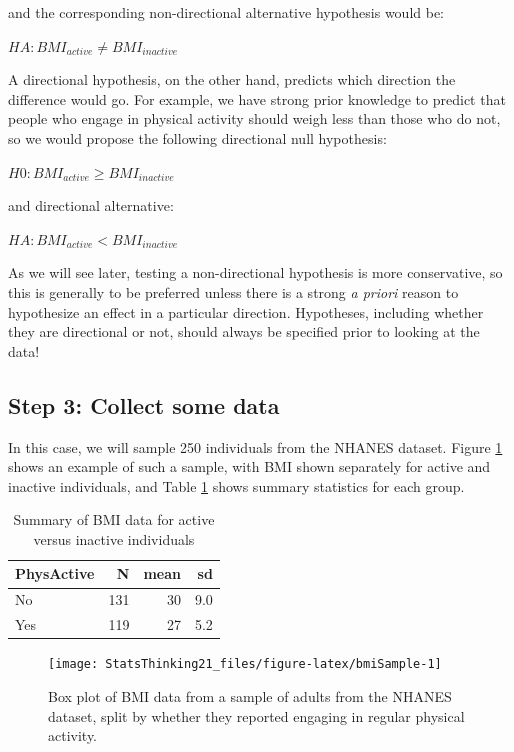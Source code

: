 \documentclass[
  12pt,
]{book}
\begin{document}
and the corresponding non-directional alternative hypothesis would be:

\(HA: BMI_{active} \neq BMI_{inactive}\)

A directional hypothesis, on the other hand, predicts which direction the difference would go. For example, we have strong prior knowledge to predict that people who engage in physical activity should weigh less than those who do not, so we would propose the following directional null hypothesis:

\(H0: BMI_{active} \ge BMI_{inactive}\)

and directional alternative:

\(HA: BMI_{active} < BMI_{inactive}\)

As we will see later, testing a non-directional hypothesis is more conservative, so this is generally to be preferred unless there is a strong \emph{a priori} reason to hypothesize an effect in a particular direction. Hypotheses, including whether they are directional or not, should always be specified prior to looking at the data!

\hypertarget{step-3-collect-some-data}{%
\subsection{Step 3: Collect some data}\label{step-3-collect-some-data}}

In this case, we will sample 250 individuals from the NHANES dataset. Figure \ref{fig:bmiSample} shows an example of such a sample, with BMI shown separately for active and inactive individuals, and Table \ref{tab:summaryTable} shows summary statistics for each group.

\begin{table}

\caption{\label{tab:summaryTable}Summary of BMI data for active versus inactive individuals}
\centering
\begin{tabular}[t]{l|r|r|r}
\hline
PhysActive & N & mean & sd\\
\hline
No & 131 & 30 & 9.0\\
\hline
Yes & 119 & 27 & 5.2\\
\hline
\end{tabular}
\end{table}

\begin{figure}
\texttt{[image: StatsThinking21\_files/figure-latex/bmiSample-1]} \caption{Box plot of BMI data from a sample of adults from the NHANES dataset, split by whether they reported engaging in regular physical activity.}\label{fig:bmiSample}
\end{figure}
\end{document}
